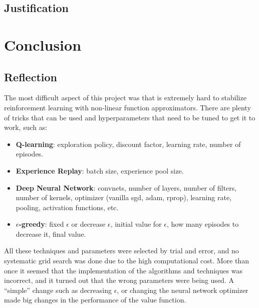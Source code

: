 \documentclass[a4paper]{article}
\begin{document}
\subsection{Justification}



\section{Conclusion}

\subsection{Reflection}
The most difficult aspect of this project was that is extremely hard to stabilize reinforcement learning with non-linear function approximators. There are plenty of tricks that can be used and hyperparameters that need to be tuned to get it to work, such as:

\begin{itemize}

    \item \textbf{Q-learning}: exploration policy, discount factor, learning rate, number of episodes.

    \item \textbf{Experience Replay}: batch size, experience pool size.

    \item \textbf{Deep Neural Network}: convnets, number of layers, number of filters, number of kernels, optimizer (vanilla sgd, adam, rprop), learning rate, pooling, activation functions, etc.

    \item \textbf{$\epsilon$-greedy}: fixed $\epsilon$ or decrease $\epsilon$, initial value for $\epsilon$, how many episodes to decrease it, final value.

\end{itemize}

All these techniques and parameters were selected by trial and error, and no systematic grid search was done due to the high computational cost. More than once it seemed that the implementation of the algorithms and techniques was incorrect, and it turned out that the wrong parameters were being used. A ``simple'' change such as decreasing $\epsilon$, or changing the neural network optimizer made big changes in the performance of the value function.
\end{document}
